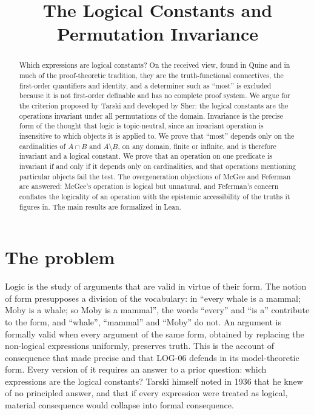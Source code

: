 \documentclass{situationist-preprint}
\title{The Logical Constants and Permutation Invariance}
\begin{document}
\maketitle

\begin{abstract}
Which expressions are logical constants? On the received view, found in Quine and in much of the proof-theoretic tradition, they are the truth-functional connectives, the first-order quantifiers and identity, and a determiner such as \enquote{most} is excluded because it is not first-order definable and has no complete proof system. We argue for the criterion proposed by Tarski and developed by Sher: the logical constants are the operations invariant under all permutations of the domain. Invariance is the precise form of the thought that logic is topic-neutral, since an invariant operation is insensitive to which objects it is applied to. We prove that \enquote{most} depends only on the cardinalities of $A \cap B$ and $A \setminus B$, on any domain, finite or infinite, and is therefore invariant and a logical constant. We prove that an operation on one predicate is invariant if and only if it depends only on cardinalities, and that operations mentioning particular objects fail the test. The overgeneration objections of McGee and Feferman are answered: McGee's operation is logical but unnatural, and Feferman's concern conflates the logicality of an operation with the epistemic accessibility of the truths it figures in. The main results are formalized in Lean.
\end{abstract}

\section{The problem}

Logic is the study of arguments that are valid in virtue of their form. The notion of form presupposes a division of the vocabulary: in \enquote{every whale is a mammal; Moby is a whale; so Moby is a mammal}, the words \enquote{every} and \enquote{is a} contribute to the form, and \enquote{whale}, \enquote{mammal} and \enquote{Moby} do not. An argument is formally valid when every argument of the same form, obtained by replacing the non-logical expressions uniformly, preserves truth. This is the account of consequence that \citet{Tarski1936} made precise and that LOG-06 defends in its model-theoretic form. Every version of it requires an answer to a prior question: which expressions are the logical constants? Tarski himself noted in 1936 that he knew of no principled answer, and that if every expression were treated as logical, material consequence would collapse into formal consequence.
\end{document}
